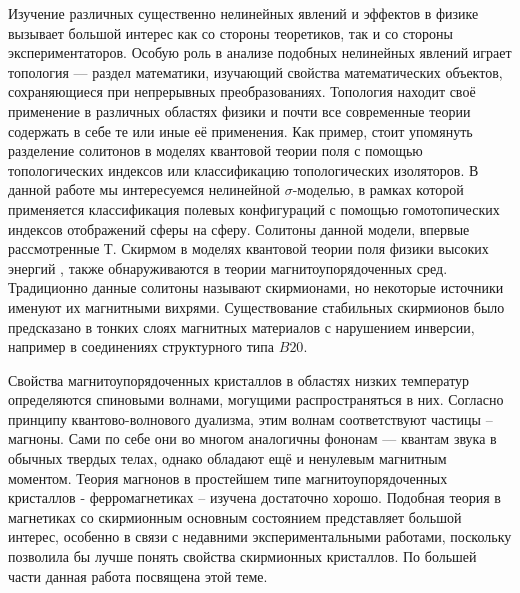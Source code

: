 \documentclass[a4paper,article,14pt]{extarticle}
\begin{document}


\tableofcontents
\pagebreak


Изучение различных существенно нелинейных явлений и эффектов в физике вызывает большой интерес как со стороны теоретиков, так и со стороны экспериментаторов.  Особую роль в анализе подобных нелинейных явлений играет топология --- раздел математики, изучающий свойства математических объектов, сохраняющиеся при непрерывных преобразованиях. Топология находит своё применение в различных областях физики и почти все современные теории содержать в себе те или иные её применения. Как пример, стоит упомянуть разделение солитонов в моделях квантовой теории поля \cite{rajaraman} с помощью топологических индексов или классификацию топологических изоляторов. \cite{kitaev} В данной работе мы интересуемся нелинейной $\sigma$-моделью, в рамках которой применяется классификация полевых конфигураций с помощью гомотопических индексов отображений сферы на сферу. Солитоны данной модели, впервые рассмотренные Т. Скирмом в моделях квантовой теории поля физики высоких энергий \cite{skyrme}, также обнаруживаются в теории магнитоупорядоченных сред. Традиционно данные солитоны называют скирмионами, но некоторые источники \cite{bogdanov} именуют их магнитными вихрями. Существование стабильных скирмионов было предсказано в тонких слоях магнитных материалов с нарушением инверсии, например в соединениях структурного типа $B20$.\cite{roslerBogdanov, bogdanov}

Свойства магнитоупорядоченных кристаллов в областях низких температур определяются спиновыми волнами, \cite{ahiezer} могущими распространяться в них. Согласно принципу квантово-волнового дуализма, этим волнам соответствуют частицы – магноны. Сами по себе они во многом аналогичны фононам --- квантам звука в обычных твердых телах, однако обладают ещё и ненулевым магнитным моментом. Теория магнонов в простейшем типе магнитоупорядоченных кристаллов - ферромагнетиках – изучена достаточно хорошо. Подобная теория в магнетиках со скирмионным основным состоянием представляет большой интерес, особенно в связи с недавними экспериментальными работами, \cite{mulhbauer, yu} поскольку позволила бы лучше понять свойства скирмионных кристаллов. По большей части данная работа посвящена этой теме.
\end{document}
